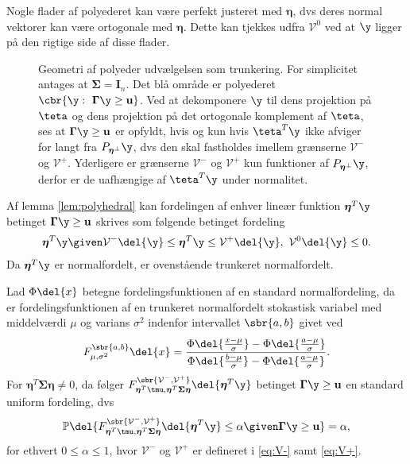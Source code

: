 Nogle flader af polyederet kan være perfekt justeret med \(\boldsymbol{\eta}\), dvs deres normal vektorer kan være ortogonale med \(\boldsymbol{\eta}\).
Dette kan tjekkes udfra \(\mathcal{V}^0\) ved at \(\y\) ligger på den rigtige side af disse flader.  
%
\begin{figure}[H]
\centering
\scalebox{1}{}
\caption{Geometri af polyeder udvælgelsen som trunkering. For simplicitet antages at \(\boldsymbol{\Sigma} = \mathbf{I}_n\). Det blå område er polyederet \(\cbr{\y : \ \boldsymbol{\Gamma} \y \geq \mathbf{u}}\).
Ved at dekomponere \(\y\) til dens projektion på \(\teta\) og dens projektion på det ortogonale komplement af \(\teta\), ses at \(\boldsymbol{\Gamma} \y \geq \mathbf{u}\) er opfyldt, hvis og kun hvis \(\teta^T \y\) ikke afviger for langt fra \(P_{\boldsymbol{\eta}^\perp} \y\), dvs den skal fastholdes imellem grænserne \(\mathcal{V}^-\) og \(\mathcal{V}^+\).
Yderligere er grænserne \(\mathcal{V}^-\) og \(\mathcal{V}^+\) kun funktioner af \(P_{\boldsymbol{\eta}^\perp} \y\), derfor er de uafhængige af \(\teta^T \y\) under normalitet.} \label{fig:polyhedron}
\end{figure}
%
Af lemma \ref{lem:polyhedral} kan fordelingen af enhver lineær funktion \(\boldsymbol{\eta}^T \y\) betinget \(\boldsymbol{\Gamma} \y \geq \mathbf{u}\) skrives som følgende betinget fordeling
\begin{align*}
\boldsymbol{\eta}^T \y \given \mathcal{V}^- \del{\y} \leq \boldsymbol{\eta}^T \y \leq \mathcal{V}^+ \del{\y}, \ \mathcal{V}^0 \del{\y} \leq 0.
\end{align*}
Da \(\boldsymbol{\eta}^T \y\) er normalfordelt, er ovenstående trunkeret normalfordelt.
%
\begin{lem}  \label{lem:lem2}
Lad \(\Phi \del{x}\) betegne fordelingsfunktionen af en standard normalfordeling, da er fordelingsfunktionen af en trunkeret normalfordelt stokastisk variabel med middelværdi \(\mu\) og varians \(\sigma^2\) indenfor intervallet \(\sbr{a,b}\) givet ved
\begin{align*}
F_{\mu, \sigma^2}^{\sbr{a,b}} \del{x} = \frac{\Phi\del{\frac{x-\mu}{\sigma}} - \Phi\del{\frac{a-\mu}{\sigma}}}{\Phi\del{\frac{b-\mu}{\sigma}} - \Phi\del{\frac{a-\mu}{\sigma}}}.
\end{align*}
For \(\boldsymbol{\eta}^T \boldsymbol{\Sigma} \boldsymbol{\eta} \neq 0\), da følger  \(F_{\boldsymbol{\eta}^T \tmu, \boldsymbol{\eta}^T \boldsymbol{\Sigma} \boldsymbol{\eta}}^{\sbr{\mathcal{V}^-,\mathcal{V}^+}} \del{\boldsymbol{\eta}^T \y} \) betinget \(\boldsymbol{\Gamma} \y \geq \mathbf{u}\) en standard uniform fordeling, dvs
\begin{align*}
\mathbb{P} \del{F_{\boldsymbol{\eta}^T \tmu, \boldsymbol{\eta}^T \boldsymbol{\Sigma} \boldsymbol{\eta}}^{\sbr{\mathcal{V}^-,\mathcal{V}^+}} \del{\boldsymbol{\eta}^T \y} \leq \alpha \given \boldsymbol{\Gamma} \y \geq \mathbf{u}} = \alpha, 
\end{align*}
for ethvert \(0 \leq \alpha \leq 1\), hvor \(\mathcal{V}^-\) og \(\mathcal{V}^+\) er defineret i \eqref{eq:V-} samt \eqref{eq:V+}. 
\end{lem}
